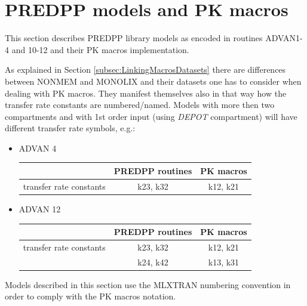 \section{PREDPP models and PK macros}
\label{subsec:PREDPPinMACROS}

This section describes PREDPP library models as encoded in routines ADVAN1-4 and 10-12 
and their PK macros implementation. 


As explained in Section \ref{subsec:LinkingMacrosDatasets} there are differences between 
NONMEM and MONOLIX and their datasets one has to consider when dealing with PK macros.
They manifest themselves also in that way how the transfer rate constants are numbered/named. 
Models with more then two compartments and with 1st order input (using \emph{DEPOT} 
compartment) will have different transfer rate symbols, e.g.:
\begin{itemize}
\item
ADVAN 4
\begin{table}[ht]
\begin{center}
\begin{tabular}{lcc}
  \hline
  \hline
				 	& PREDPP routines 	& PK macros \\
  \hline
transfer rate constants 	& k23, k32 		& k12, k21  \\
   \hline
\end{tabular}
\end{center}
\end{table}

\item
ADVAN 12 
\begin{table}[ht]
\begin{center}
\begin{tabular}{lcc}
  \hline
  \hline
				 	& PREDPP routines 	& PK macros \\
  \hline
transfer rate constants 	& k23, k32 		& k12, k21  \\
					& k24, k42 		& k13, k31  \\
   \hline
\end{tabular}
\end{center}
\end{table}
\end{itemize}
Models described in this section use the MLXTRAN numbering convention in order to comply
with the PK macros notation.

